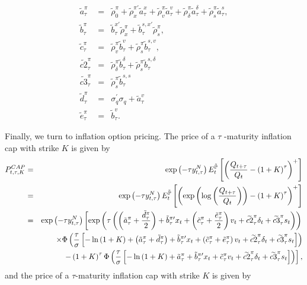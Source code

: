 \documentclass{article}
\begin{document}
\begin{eqnarray*}
\tilde{a}_{\tau }^{\pi } &=&\widetilde{\rho }_{0}^{\pi }+\widetilde{\rho }%
_{x}^{\pi \prime }\tilde{a}_{\tau }^{x}+\widetilde{\rho }_{v}^{\pi }\tilde{a}%
_{\tau }^{v}+\widetilde{\rho }_{\delta }^{\pi }\tilde{a}_{\tau }^{\delta }+%
\widetilde{\rho }_{s}^{\pi }\tilde{a}_{\tau }^{s}, \\
\tilde{b}_{\tau }^{\pi } &=&\tilde{b}_{\tau }^{x\prime }\widetilde{\rho }%
_{x}^{\pi }+\tilde{b}_{\tau }^{s,x\prime }\widetilde{\rho }_{s}^{\pi }, \\
\tilde{c}_{\tau }^{\pi } &=&\widetilde{\rho }_{v}^{\pi }\tilde{b}_{\tau
}^{v}+\widetilde{\rho }_{s}^{\pi }\widetilde{b}_{\tau }^{s,v}, \\
\widetilde{c2}_{\tau }^{\pi } &=&\widetilde{\rho }_{\delta }^{\pi }\tilde{b}%
_{\tau }^{\delta }+\widetilde{\rho }_{s}^{\pi }\widetilde{b}_{\tau
}^{s,\delta } \\
\widetilde{c3}_{\tau }^{\pi } &=&\widetilde{\rho }_{s}^{\pi }\widetilde{b}%
_{\tau }^{s,s} \\
\tilde{d}_{\tau }^{\pi } &=&\sigma _{q}^{\prime }\sigma _{q}+\tilde{a}_{\tau
}^{v} \\
\tilde{e}_{\tau }^{\pi } &=&\tilde{b}_{\tau }^{v}.
\end{eqnarray*}

Finally, we turn to inflation option pricing. The price of a $\tau $%
-maturity inflation cap with strike $K$ is given by%
\begin{eqnarray*}
P_{t,\tau ,K}^{CAP} &=&\exp \left( -\tau y_{t,\tau }^{N}\right) E_{t}^{%
\mathbb{\tilde{P}}}\left[ \left( \frac{Q_{t+\tau }}{Q_{t}}-\left( 1+K\right)
^{\tau }\right) ^{+}\right] \\
&=&\exp \left( -\tau y_{t,\tau }^{N}\right) E_{t}^{\mathbb{\tilde{P}}}\left[
\left( \exp \left( \log \left( \frac{Q_{t+\tau }}{Q_{t}}\right) \right)
-\left( 1+K\right) ^{\tau }\right) ^{+}\right] \\
&=&\exp \left( -\tau y_{t,\tau }^{N}\right) \left[ \exp \left( \tau \left(
\left( \tilde{a}_{\tau }^{\pi }+\frac{\tilde{d}_{\tau }^{\pi }}{2}\right) +%
\tilde{b}_{\tau }^{\pi \prime }x_{t}+\left( \tilde{c}_{\tau }^{\pi }+\frac{%
\tilde{e}_{\tau }^{\pi }}{2}\right) v_{t}+\widetilde{c2}_{\tau }^{\pi
}\delta _{t}+\widetilde{c3}_{\tau }^{\pi }s_{t}\right) \right) \right. \\
&&\times \Phi \left( \frac{\tau }{\sigma }\left[ -\ln \left( 1+K\right)
+\left( \tilde{a}_{\tau }^{\pi }+\tilde{d}_{\tau }^{\pi }\right) +\tilde{b}%
_{\tau }^{\pi \prime }x_{t}+\left( \tilde{c}_{\tau }^{\pi }+\tilde{e}_{\tau
}^{\pi }\right) v_{t}+\widetilde{c2}_{\tau }^{\pi }\delta _{t}+\widetilde{c3}%
_{\tau }^{\pi }s_{t}\right] \right) \\
&&\left. -\left( 1+K\right) ^{\tau }\Phi \left( \frac{\tau }{\sigma }\left[
-\ln \left( 1+K\right) +\tilde{a}_{\tau }^{\pi }+\tilde{b}_{\tau }^{\pi
\prime }x_{t}+\tilde{c}_{\tau }^{\pi }v_{t}+\widetilde{c2}_{\tau }^{\pi
}\delta _{t}+\widetilde{c3}_{\tau }^{\pi }s_{t}\right] \right) \right] ,
\end{eqnarray*}%
and the price of a $\tau $-maturity inflation cap with strike $K$ is given by
\end{document}
